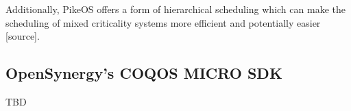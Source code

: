 Additionally, PikeOS offers a form of hierarchical scheduling which can make the scheduling of mixed criticality systems more efficient and potentially easier [source].
\subsection{OpenSynergy's COQOS MICRO SDK}
TBD

